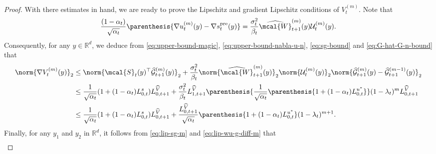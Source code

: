 \documentclass{article}
\newcommand{\R}{\mathbb{R}}
\begin{document}
\begin{proof}
With there estimates in hand, we are ready to prove the Lipschitz and gradient Lipschitz conditions of $V_t^{(m)}$. Note that
\begin{align*}
    \frac{(1 - \alpha_{t})}{\sqrt{\alpha_{t}}} \parenthesis{\nabla u_t^{(m)}(y) - \nabla s_t^{\rm pre}(y)} = \frac{\sigma_t^2}{\beta_t} \widehat{\mcal{W}}_{t+1}^{{(m)}}(y) \mathcal{U}^{(m)}_t(y).
\end{align*}
Consequently, for any $y \in \R^d$, we deduce from  \eqref{eq:upper-bound-magic}, \eqref{eq:upper-bound-nabla-u-n}, \eqref{eq:sg-bound} and \eqref{eq:G-hat-G-n-bound} that
\begin{align*}
    \norm{\nabla V_t^{(m)}(y)}_2 & \leq \norm{\mcal{S}_t(y)^\top\widehat{\mathcal{G}}_{t+1}^{(m)}(y)}_{2} + \frac{\sigma_t^2}{\beta_t} \norm{\widehat{\mcal{W}}_{t+1}^{{(m)}}(y)}_2\norm{ \mathcal{U}^{(m)}_t(y)}_2 \norm{\widehat{\mathcal{G}}_{t+1}^{(m)}(y)-\widehat{\mathcal{G}}_{t+1}^{(m-1)}(y)}_2 \\ & \leq \frac{1}{\sqrt{\alpha_t}}(1 + (1 - \alpha_t)L_{0, t}^{s})
L_{0, t+1}^{\widehat{V}} + \frac{\sigma_t^2}{\beta_t}L_{1, t+1}^{\widehat{V}}\parenthesis{\frac{1}{\sqrt{\alpha_{t}}}\parenthesis{1 + (1 - \alpha_{t})L_{0,t}^{u^{*}}}}(1- \lambda_t)^{m}L_{0, t+1}^{\widehat{V}} \\ & \leq \frac{1}{\sqrt{\alpha_t}}(1 + (1 - \alpha_t)L_{0, t}^{s})
L_{0, t+1}^{\widehat{V}} + \frac{L_{0, t+1}^{\widehat{V}}}{\sqrt{\alpha_{t}}}\parenthesis{1 + (1 - \alpha_{t})L_{0,t}^{u^{*}}}(1- \lambda_t)^{m+1}. 
\end{align*}
Finally, for any $y_1$ and $y_2$ in $\R^d$, it follows from \eqref{eq:lip-sg-m} and \eqref{eq:lip-wu-g-diff-m} that
\begin{align*}

\end{align*}
\end{proof}
\end{document}

